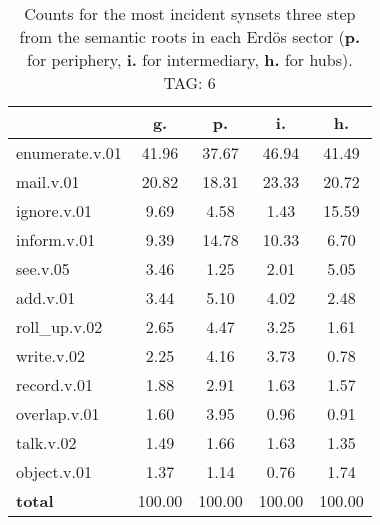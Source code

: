 \begin{table}[h!]
\begin{center}
\begin{tabular}{| l | c | c | c | c |}\hline
 & g. & p. & i. & h. \\\hline
enumerate.v.01 & 41.96  & 37.67  & 46.94  & 41.49 \\\hline
mail.v.01 & 20.82  & 18.31  & 23.33  & 20.72 \\\hline
ignore.v.01 & 9.69  & 4.58  & 1.43  & 15.59 \\\hline
inform.v.01 & 9.39  & 14.78  & 10.33  & 6.70 \\\hline
see.v.05 & 3.46  & 1.25  & 2.01  & 5.05 \\\hline
add.v.01 & 3.44  & 5.10  & 4.02  & 2.48 \\\hline
roll\_up.v.02 & 2.65  & 4.47  & 3.25  & 1.61 \\\hline
write.v.02 & 2.25  & 4.16  & 3.73  & 0.78 \\\hline
record.v.01 & 1.88  & 2.91  & 1.63  & 1.57 \\\hline
overlap.v.01 & 1.60  & 3.95  & 0.96  & 0.91 \\\hline
talk.v.02 & 1.49  & 1.66  & 1.63  & 1.35 \\\hline
object.v.01 & 1.37  & 1.14  & 0.76  & 1.74 \\\hline
{{\bf total}} & 100.00  & 100.00  & 100.00  & 100.00 \\\hline
\end{tabular}
\caption{Counts for the most incident synsets three step from the semantic roots in each Erd\"os sector ({\bf p.} for periphery, {\bf i.} for intermediary, {\bf h.} for hubs). TAG: 6}
\end{center}
\end{table}